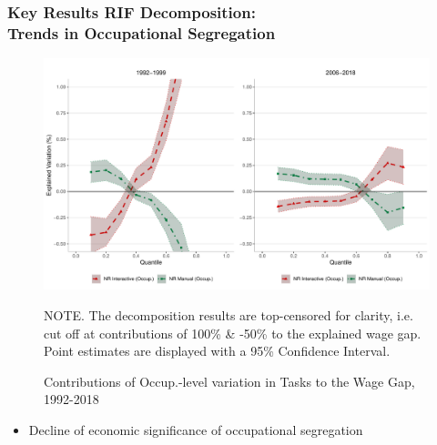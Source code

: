 \documentclass[10pt]{beamer}
\begin{document}




\begin{frame}[label=occ_spec] 
	\frametitle{Key Results RIF Decomposition: \\ Trends in  Occupational Segregation}
	
	
	\begin{figure}[H]
		\begin{minipage}{0.95\textwidth} %
			\centering
			\includegraphics[scale=0.26]{rif_bw_nrinrm}
			\caption{Contributions of Occup.-level variation in Tasks to the Wage Gap, 1992-2018 \label{fig:wgap_occ_seg} \label{fig:wage_gap_base}}
			{\footnotesize \tiny NOTE. \textemdash The decomposition results are top-censored for clarity, i.e. cut off at contributions of 100\% \& -50\% to the explained wage gap. \\ Point estimates are displayed with a 95\% Confidence Interval. \par}
		\end{minipage}
	\end{figure}
	
\begin{itemize} 
	\item Decline of economic significance of occupational segregation
\end{itemize} 

	\hyperlink{regression}{}
		
\end{frame}
\end{document}
